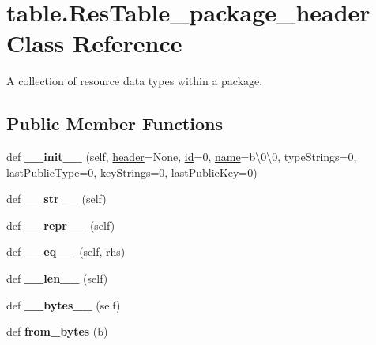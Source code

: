 \hypertarget{classtable_1_1ResTable__package__header}{}\section{table.\+Res\+Table\+\_\+package\+\_\+header Class Reference}
\label{classtable_1_1ResTable__package__header}


A collection of resource data types within a package.  


\subsection*{Public Member Functions}
\begin{DoxyCompactItemize}
\item 
\mbox{\label{classtable_1_1ResTable__package__header_a1a519e5ee8645b6225223923cc3a82e2}} 
def {\bfseries \+\_\+\+\_\+init\+\_\+\+\_\+} (self, \mbox{\hyperlink{classtable_1_1ResTable__package__header_ab1b00c59b78bb166b4badd2bd8349986}{header}}=None, \mbox{\hyperlink{classtable_1_1ResTable__package__header_aec6d0c7306dc2db3cffe486b13b32710}{id}}=0, \mbox{\hyperlink{classtable_1_1ResTable__package__header_ac1a009f4b944a30835e07f3e0f204161}{name}}=b\textquotesingle{}\textbackslash{}0\textbackslash{}0\textquotesingle{}, type\+Strings=0, last\+Public\+Type=0, key\+Strings=0, last\+Public\+Key=0)
\item 
\mbox{\label{classtable_1_1ResTable__package__header_a333d75a6640d5d646bdf409b0a4bee65}} 
def {\bfseries \+\_\+\+\_\+str\+\_\+\+\_\+} (self)
\item 
\mbox{\label{classtable_1_1ResTable__package__header_af385b5cb5987137685cd4b2df983f8dd}} 
def {\bfseries \+\_\+\+\_\+repr\+\_\+\+\_\+} (self)
\item 
\mbox{\label{classtable_1_1ResTable__package__header_aae82089f262abc4744e6e3761f405d7d}} 
def {\bfseries \+\_\+\+\_\+eq\+\_\+\+\_\+} (self, rhs)
\item 
\mbox{\label{classtable_1_1ResTable__package__header_a8563874cb55ee804ffb747cfcf9cc3d9}} 
def {\bfseries \+\_\+\+\_\+len\+\_\+\+\_\+} (self)
\item 
\mbox{\label{classtable_1_1ResTable__package__header_a3f8064732ac0c6ff9825ff21d6d124da}} 
def {\bfseries \+\_\+\+\_\+bytes\+\_\+\+\_\+} (self)
\item 
\mbox{\label{classtable_1_1ResTable__package__header_a11e07aa4a8690dc5ab25b72fd4626a39}} 
def {\bfseries from\+\_\+bytes} (b)
\end{DoxyCompactItemize}
